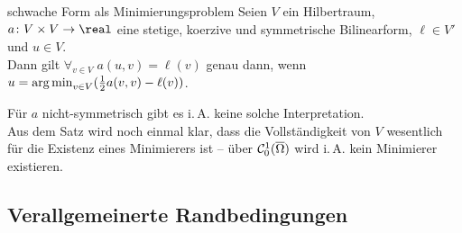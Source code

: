 \linie

\begin{Satz}{schwache Form als Minimierungsproblem}
    Seien $V$ ein Hilbertraum, $a\colon V \times V \to \real$ eine stetige, koerzive und
    symmetrische Bilinearform, $\ell \in V'$ und $u \in V$.\\
    Dann gilt $\forall_{v \in V}\; a(u, v) = \ell(v)$ genau dann, wenn
    $u = \operatorname{arg\,min}_{v \in V} (\frac{1}{2} a(v, v) - \ell(v))$.
\end{Satz}

\begin{Bem}
    Für $a$ nicht-symmetrisch gibt es i.\,A. keine solche Interpretation.\\
    Aus dem Satz wird noch einmal klar, dass die Vollständigkeit von $V$ wesentlich für
    die Existenz eines Minimierers ist --
    über $\mathcal{C}^1_0(\overline{\Omega})$ wird i.\,A. kein Minimierer existieren.
\end{Bem}

\pagebreak

\subsection{%
    Verallgemeinerte Randbedingungen%
}

